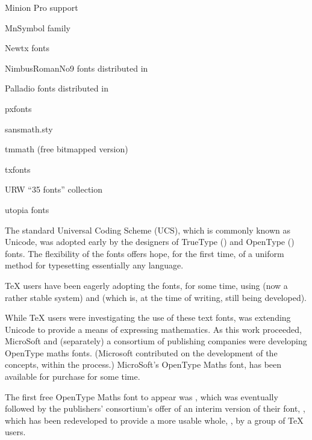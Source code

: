 \begin{ctanrefs}
\item[\nothtml{\normalfont}Minion Pro support]
\item[MnSymbol \nothtml{\normalfont}family]
\item[Newtx \nothtml{\normalfont}fonts]
\item[NimbusRomanNo9 fonts]distributed in 
\item[Palladio fonts]distributed in 
\item[pxfonts]
\item[sansmath.sty]
\item[tmmath \nothtml{\normalfont\itshape}(free bitmapped version)]%
\item[txfonts]
\item[\nothtml{\normalfont}URW ``35 fonts'' collection]
\item[utopia \nothtml{\normalfont}fonts]
\end{ctanrefs}


The  standard Universal Coding Scheme (UCS), which is
commonly known as Unicode, was adopted early by the designers of
TrueType () and OpenType () fonts.  The
flexibility of the fonts offers hope, for the first time, of a uniform
method for typesetting essentially any language.

\TeX{} users have been eagerly adopting the fonts, for some time,
using \xetex{} (now a rather stable system) and \LuaTeX{} (which is,
at the time of writing, still being developed).

While \TeX{} users were investigating the use of these text fonts,
 was extending Unicode to provide a means of expressing
mathematics.  As this work proceeded, MicroSoft and (separately) a
consortium of publishing companies were developing OpenType maths
fonts.  (Microsoft contributed on the development of the concepts,
within the  process.)  MicroSoft's OpenType Maths font,
 has been available for purchase for some time.

The first free OpenType Maths font to appear was %
, which was eventually followed by
the publishers' consortium's offer of an interim version
of their font, , which has been
redeveloped to provide a more usable whole, , by a group
of \TeX{} users.

